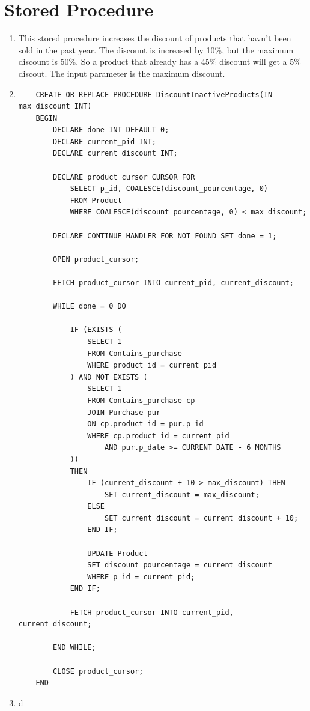 \documentclass[a4paper,11pt]{article}
\begin{document}
\section*{Stored Procedure}

\begin{enumerate}[label=(\alph*)]
    \item This stored procedure increases the discount of products that havn't been sold in the past year. The discount is increased by 10\%, but the maximum discount is 50\%.
    So a product that already has a 45\% discount will get a 5\% discout. The input parameter is the maximum discount.
    \item
    \begin{lstlisting}
    CREATE OR REPLACE PROCEDURE DiscountInactiveProducts(IN max_discount INT)
    BEGIN
        DECLARE done INT DEFAULT 0;
        DECLARE current_pid INT;
        DECLARE current_discount INT;
    
        DECLARE product_cursor CURSOR FOR
            SELECT p_id, COALESCE(discount_pourcentage, 0)
            FROM Product
            WHERE COALESCE(discount_pourcentage, 0) < max_discount;
    
        DECLARE CONTINUE HANDLER FOR NOT FOUND SET done = 1;
    
        OPEN product_cursor;
    
        FETCH product_cursor INTO current_pid, current_discount;
    
        WHILE done = 0 DO

            IF (EXISTS (
                SELECT 1 
                FROM Contains_purchase
                WHERE product_id = current_pid
            ) AND NOT EXISTS (
                SELECT 1
                FROM Contains_purchase cp
                JOIN Purchase pur
                ON cp.product_id = pur.p_id
                WHERE cp.product_id = current_pid
                    AND pur.p_date >= CURRENT DATE - 6 MONTHS
            )) 
            THEN
                IF (current_discount + 10 > max_discount) THEN
                    SET current_discount = max_discount;
                ELSE 
                    SET current_discount = current_discount + 10;
                END IF;
    
                UPDATE Product
                SET discount_pourcentage = current_discount
                WHERE p_id = current_pid;
            END IF;
    
            FETCH product_cursor INTO current_pid, current_discount;
    
        END WHILE;
    
        CLOSE product_cursor;
    END
    \end{lstlisting}

    \item d
\end{enumerate}
\end{document}

